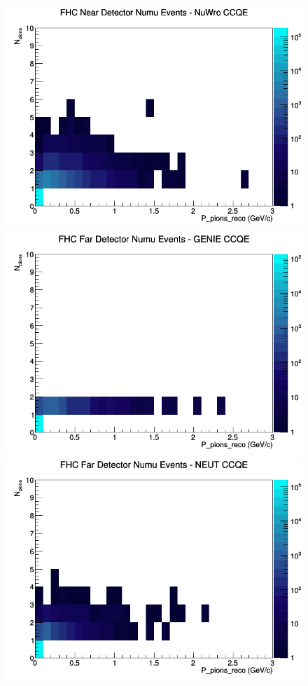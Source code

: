 \documentclass[12pt]{article}
\begin{document}
\begin{figure}[h]
\includegraphics[width=\linewidth]{eff_N_P/GAr/pions/CCQE_FHC_ND_numu_N_P_NuWro.png}
\endminipage
\newline
{}
\includegraphics[width=\linewidth]{eff_N_P/GAr/pions/CCQE_FHC_FD_numu_N_P_GENIE.png}
\endminipage
{}
\includegraphics[width=\linewidth]{eff_N_P/GAr/pions/CCQE_FHC_FD_numu_N_P_NEUT.png}

\end{figure}
\end{document}

